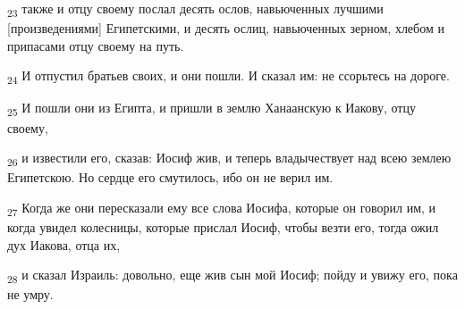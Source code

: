 \begin{tcolorbox}
\textsubscript{23} также и отцу своему послал десять ослов, навьюченных лучшими [произведениями] Египетскими, и десять ослиц, навьюченных зерном, хлебом и припасами отцу своему на путь.
\end{tcolorbox}
\begin{tcolorbox}
\textsubscript{24} И отпустил братьев своих, и они пошли. И сказал им: не ссорьтесь на дороге.
\end{tcolorbox}
\begin{tcolorbox}
\textsubscript{25} И пошли они из Египта, и пришли в землю Ханаанскую к Иакову, отцу своему,
\end{tcolorbox}
\begin{tcolorbox}
\textsubscript{26} и известили его, сказав: Иосиф жив, и теперь владычествует над всею землею Египетскою. Но сердце его смутилось, ибо он не верил им.
\end{tcolorbox}
\begin{tcolorbox}
\textsubscript{27} Когда же они пересказали ему все слова Иосифа, которые он говорил им, и когда увидел колесницы, которые прислал Иосиф, чтобы везти его, тогда ожил дух Иакова, отца их,
\end{tcolorbox}
\begin{tcolorbox}
\textsubscript{28} и сказал Израиль: довольно, еще жив сын мой Иосиф; пойду и увижу его, пока не умру.
\end{tcolorbox}

